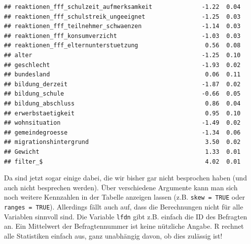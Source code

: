 \documentclass[
]{book}
\begin{document}
\begin{verbatim}
## reaktionen_fff_schulzeit_aufmerksamkeit              -1.22  0.04
## reaktionen_fff_schulstreik_ungeeignet                -1.25  0.03
## reaktionen_fff_teilnehmer_schwaenzen                 -1.14  0.03
## reaktionen_fff_konsumverzicht                        -1.03  0.03
## reaktionen_fff_elternunterstuetzung                   0.56  0.08
## alter                                                -1.25  0.10
## geschlecht                                           -1.93  0.02
## bundesland                                            0.06  0.11
## bildung_derzeit                                      -1.87  0.02
## bildung_schule                                       -0.66  0.05
## bildung_abschluss                                     0.86  0.04
## erwerbstaetigkeit                                     0.95  0.10
## wohnsituation                                        -1.49  0.02
## gemeindegroesse                                      -1.34  0.06
## migrationshintergrund                                 3.50  0.02
## Gewicht                                               1.33  0.01
## filter_$                                              4.02  0.01
\end{verbatim}

Da sind jetzt sogar einige dabei, die wir bisher gar nicht besprochen haben (und auch nicht besprechen werden). Über verschiedene Argumente kann man sich noch weitere Kennzahlen in der Tabelle anzeigen lassen (z.B. \texttt{skew\ =\ TRUE} oder \texttt{ranges\ =\ TRUE}). Allerdings fällt auch auf, dass die Berechnungen nicht für alle Variablen sinnvoll sind. Die Variable \texttt{lfdn} gibt z.B. einfach die ID des Befragten an. Ein Mittelwert der Befragtennummer ist keine nützliche Angabe. R rechnet alle Statistiken einfach aus, ganz unabhängig davon, ob dies zulässig ist!

  
\end{document}
